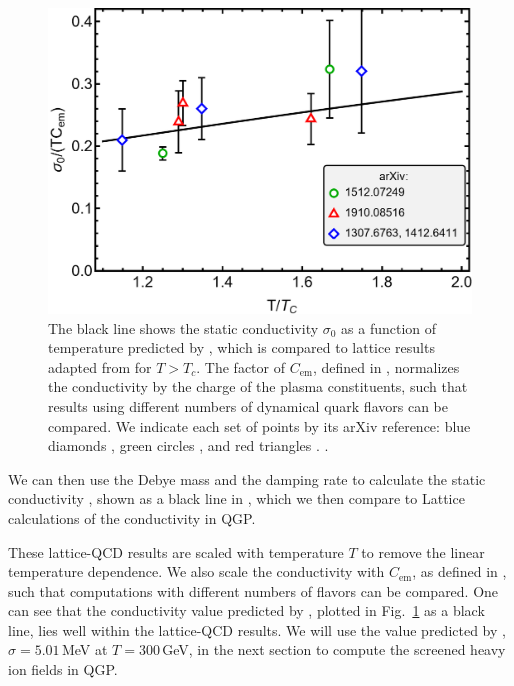 \begin{figure}[ht]
    \centering
    \includegraphics[width=0.85\linewidth]{plots/chap02QCD/condcomp.png}
    \caption{The black line shows the static conductivity $\sigma_0$ as a function of temperature predicted by , which is compared to lattice results adapted from \cite{Aarts:2020dda} for $T>T_c$. The factor of $C_{\text{em}}$, defined in , normalizes the conductivity by the charge of the plasma constituents, such that results using different numbers of dynamical quark flavors can be compared. We indicate each set of points by its arXiv reference: blue diamonds \cite{Amato:2013naa,Aarts:2014nba}, green circles \cite{Brandt:2015aqk}, and red triangles \cite{Astrakhantsev:2019zkr}. .}
    \label{fig:lattice comp}
\end{figure}


We can then use the Debye mass  and the damping rate  to calculate the static conductivity , shown as a black line in , which we then compare to Lattice calculations of the conductivity in QGP.


These lattice-QCD results \cite{Amato:2013naa,Aarts:2014nba,Brandt:2015aqk,Astrakhantsev:2019zkr} are scaled with temperature $T$ to remove the linear temperature dependence. We also scale the conductivity with $C_{\text{em}}$, as defined in , such that computations with different numbers of flavors can be compared. One can see that the conductivity value predicted by , plotted in Fig.~\ref{fig:lattice comp} as a black line, lies well within the lattice-QCD results. We will use the value predicted by , $\sigma = 5.01\,$MeV at $T=300\,$GeV, in the next section to compute the screened heavy ion fields in QGP.

